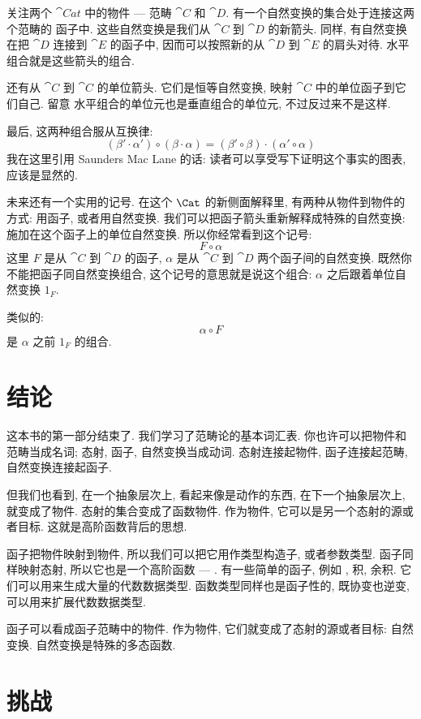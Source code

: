 \noindent
关注两个 $\cat{Cat}$ 中的物件 --- 范畴 $\cat{C}$ 和 $\cat{D}$. 有一个自然变换的集合处于连接这两个范畴的
函子中. 这些自然变换是我们从 $\cat{C}$ 到 $\cat{D}$ 的新箭头. 同样, 有自然变换在把 $\cat{D}$ 连接到 $\cat{E}$
的函子中, 因而可以按照新的从 $\cat{D}$ 到 $\cat{E}$ 的肩头对待. 水平组合就是这些箭头的组合.

还有从 $\cat{C}$ 到 $\cat{C}$ 的单位箭头. 它们是恒等自然变换, 映射 $\cat{C}$ 中的单位函子到它们自己. 留意
水平组合的单位元也是垂直组合的单位元, 不过反过来不是这样.

最后, 这两种组合服从互换律:
\[(\beta' \cdot \alpha') \circ (\beta \cdot \alpha) = (\beta' \circ \beta) \cdot (\alpha' \circ \alpha)\]
我在这里引用 Saunders Mac Lane 的话: 读者可以享受写下证明这个事实的图表, 应该是显然的.

未来还有一个实用的记号. 在这个 $\Cat$ 的新侧面解释里, 有两种从物件到物件的方式: 用函子, 或者用自然变换.
我们可以把函子箭头重新解释成特殊的自然变换: 施加在这个函子上的单位自然变换. 所以你经常看到这个记号:
\[F \circ \alpha\]
这里 $F$ 是从 $\cat{C}$ 到 $\cat{D}$ 的函子, $\alpha$ 是从 $\cat{C}$ 到 $\cat{D}$ 两个函子间的自然变换.
既然你不能把函子同自然变换组合, 这个记号的意思就是说这个组合: $\alpha$ 之后跟着单位自然变换 $1_F$.

类似的:
\[\alpha \circ F\]
是 $\alpha$ 之前 $1_F$ 的组合.

\section{结论}

这本书的第一部分结束了. 我们学习了范畴论的基本词汇表. 你也许可以把物件和范畴当成名词; 态射, 函子, 自然变换当成动词.
态射连接起物件, 函子连接起范畴, 自然变换连接起函子.

但我们也看到, 在一个抽象层次上, 看起来像是动作的东西, 在下一个抽象层次上, 就变成了物件. 态射的集合变成了函数物件.
作为物件, 它可以是另一个态射的源或者目标. 这就是高阶函数背后的思想.

函子把物件映射到物件, 所以我们可以把它用作类型构造子, 或者参数类型. 函子同样映射态射, 所以它也是一个高阶函数
 --- . 有一些简单的函子, 例如 , 积, 余积. 它们可以用来生成大量的代数数据类型.
 函数类型同样也是函子性的, 既协变也逆变, 可以用来扩展代数数据类型.

函子可以看成函子范畴中的物件. 作为物件, 它们就变成了态射的源或者目标: 自然变换. 自然变换是特殊的多态函数.


\section{挑战}

